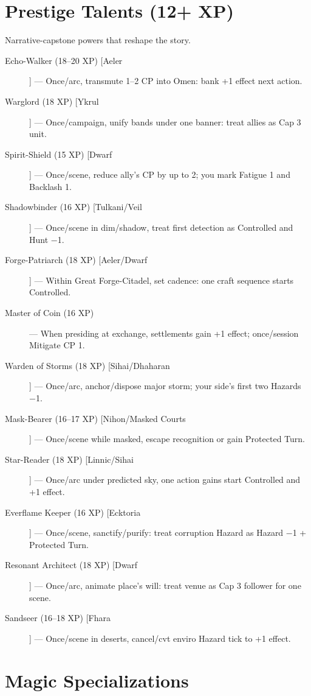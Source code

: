 \section{Prestige Talents (12+ XP)}

Narrative-capstone powers that reshape the story.

\begin{description}
  \item[Echo-Walker (18–20 XP) [Aeler]] — Once/arc, transmute 1–2 CP into Omen: bank +1 effect next action.
  \item[Warglord (18 XP) [Ykrul]] — Once/campaign, unify bands under one banner: treat allies as Cap 3 unit.
  \item[Spirit-Shield (15 XP) [Dwarf]] — Once/scene, reduce ally's CP by up to 2; you mark Fatigue 1 and Backlash 1.
  \item[Shadowbinder (16 XP) [Tulkani/Veil]] — Once/scene in dim/shadow, treat first detection as Controlled and Hunt −1.
  \item[Forge-Patriarch (18 XP) [Aeler/Dwarf]] — Within Great Forge-Citadel, set cadence: one craft sequence starts Controlled.
  \item[Master of Coin (16 XP)] — When presiding at exchange, settlements gain +1 effect; once/session Mitigate CP 1.
  \item[Warden of Storms (18 XP) [Sihai/Dhaharan]] — Once/arc, anchor/dispose major storm; your side's first two Hazards −1.
  \item[Mask-Bearer (16–17 XP) [Nihon/Masked Courts]] — Once/scene while masked, escape recognition or gain Protected Turn.
  \item[Star-Reader (18 XP) [Linnic/Sihai]] — Once/arc under predicted sky, one action gains start Controlled and +1 effect.
  \item[Everflame Keeper (16 XP) [Ecktoria]] — Once/scene, sanctify/purify: treat corruption Hazard as Hazard −1 + Protected Turn.
  \item[Resonant Architect (18 XP) [Dwarf]] — Once/arc, animate place's will: treat venue as Cap 3 follower for one scene.
  \item[Sandseer (16–18 XP) [Fhara]] — Once/scene in deserts, cancel/cvt enviro Hazard tick to +1 effect.
\end{description}

\section{Magic Specializations}

